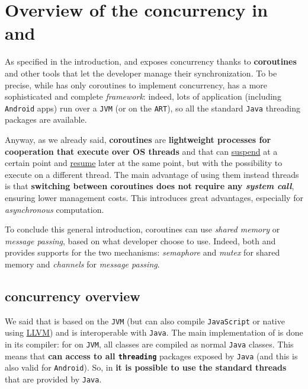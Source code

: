\section{Overview of the concurrency in \Kotlin and \Go}

As specified in the introduction, \Kotlin and \Go exposes concurrency thanks to \textbf{coroutines} and other tools that let the developer manage their synchronization. To be precise, while \Go has only coroutines to implement concurrency, \Kotlin has a more sophisticated and complete \textit{framework}: indeed, lots of \Kotlin application (including \texttt{Android} apps) run over a \texttt{JVM} (or on the \texttt{ART}), so all the standard \texttt{Java} threading packages are available.

Anyway, as we already said, \textbf{coroutines} are \textbf{lightweight processes for cooperation that execute over OS threads} and that can \uline{suspend} at a certain point and \uline{resume} later at the same point, but with the possibility to execute on a different thread. The main advantage of using them instead threads is that \textbf{switching between coroutines does not require any \textit{system call}}, ensuring lower management costs.
This introduces great advantages, especially for \textit{asynchronous} computation.

To conclude this general introduction, coroutines can use \textit{shared memory} or \textit{message passing}, based on what developer choose to use. Indeed, both \Kotlin and \Go provides supports for the two mechanisms: \textit{semaphore} and \textit{mutex} for shared memory and \textit{channels} for \textit{message passing}.

\subsection{\Kotlin concurrency overview}

We said that \Kotlin is based on the \texttt{JVM} (but can also compile \texttt{JavaScript} or native using \href{https://llvm.org/}{LLVM}) and is interoperable with \texttt{Java}. The main implementation of \Kotlin is done in its compiler: for \Kotlin on \texttt{JVM}, all classes are compiled as normal \texttt{Java} classes. This means that \textbf{\Kotlin can access to all \texttt{threading}} packages exposed by \texttt{Java} (and this is also valid for \texttt{Android}). So, in \Kotlin \textbf{it is possible to use the standard threads} that are provided by \texttt{Java}.

